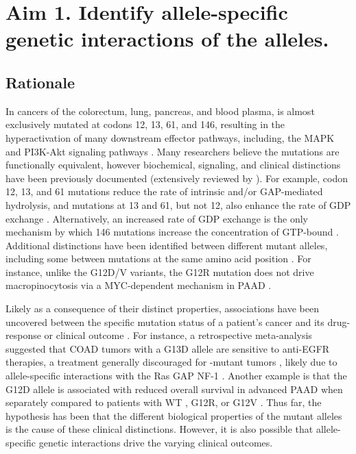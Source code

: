\section{Aim 1. Identify allele-specific genetic interactions of the \KRAS{} alleles.}

\subsection*{Rationale}

In cancers of the colorectum, lung, pancreas, and blood plasma, \KRAS{} is almost exclusively mutated at codons 12, 13, 61, and 146, resulting in the hyperactivation of many downstream effector pathways, including, the MAPK and PI3K-Akt signaling pathways \cite{Simanshu2017}.
Many researchers believe the mutations are functionally equivalent, however biochemical, signaling, 
and clinical distinctions have been previously documented (extensively reviewed by \cite{Miller2012, Li2018}).
For example, codon 12, 13, and 61 mutations reduce the rate of intrinsic and/or GAP-mediated hydrolysis, and mutations at 13 and 61, but not 12, also enhance the rate of GDP exchange \cite{Hunter2015a, Smith2013}.
Alternatively, an increased rate of GDP exchange is the only mechanism by which 146 mutations increase the concentration of GTP-bound \kras{} \cite{Feig1988RelationshipProteins., Edkins2006, Janakiraman2010, Poulin2019}.
Additional distinctions have been identified between different mutant alleles, including some between mutations at the same amino acid position \cite{Pershing2015, Hunter2015a, Poulin2019, Hobbs2019AtypicalCancer., Yuan2018, Kovalski2019, Ihle2012, Spoerner2004, Smith2014a, Pantsar2018}.
For instance, unlike the G12D/V variants, the G12R mutation does not drive macropinocytosis via a MYC-dependent mechanism in PAAD \cite{Hobbs2019AtypicalCancer.}.

Likely as a consequence of their distinct properties, associations have been uncovered between the specific \KRAS{} mutation status of a patient's cancer and its drug-response or clinical outcome \cite{Haigis2017, Li2018}.
For instance, a retrospective meta-analysis suggested that COAD tumors with a \KRAS{} G13D allele are sensitive to anti-EGFR therapies, a treatment generally discouraged for \KRAS{}-mutant tumors \cite{DeRoock2010}, likely due to allele-specific interactions with the Ras GAP NF-1 \cite{McFall2019, Rabara2019, Zafra2019}.
Another example is that the \KRAS{} G12D allele is associated with reduced overall survival in advanced PAAD when separately compared to patients with WT \KRAS{}, \KRAS{} G12R, or \KRAS{} G12V \cite{Bournet2016}.
Thus far, the hypothesis has been that the different biological properties of the mutant \KRAS{} alleles is the cause of these clinical distinctions.
However, it is also possible that allele-specific genetic interactions drive the varying clinical outcomes.

